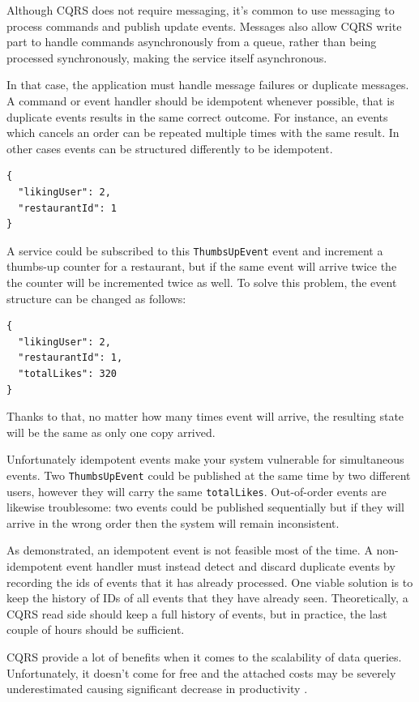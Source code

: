 \documentclass[conference]{IEEEtran}
\begin{document}
Although CQRS does not require messaging, it's common to use messaging to process commands and publish update events. Messages also allow CQRS write part to handle commands asynchronously from a queue, rather than being processed synchronously, making the service itself asynchronous.

In that case, the application must handle message failures or duplicate messages. A command or event handler should be idempotent whenever possible, that is duplicate events results in the same correct outcome. For instance, an events which cancels an order can be repeated multiple times with the same result. In other cases events can be structured differently to be idempotent.

\begin{lstlisting}
{
  "likingUser": 2,
  "restaurantId": 1
}
\end{lstlisting}

A service could be subscribed to this \texttt{ThumbsUpEvent} event and increment a thumbs-up counter for a restaurant, but if the same event will arrive twice the the counter will be incremented twice as well. To solve this problem, the event structure can be changed as follows:

\begin{lstlisting}
{
  "likingUser": 2,
  "restaurantId": 1,
  "totalLikes": 320
}
\end{lstlisting}

Thanks to that, no matter how many times event will arrive, the resulting state will be the same as only one copy arrived.

Unfortunately idempotent events make your system vulnerable for simultaneous events. Two \texttt{ThumbsUpEvent} could be published at the same time by two different users, however they will carry the same \texttt{totalLikes}. Out-of-order events are likewise troublesome: two events could be published sequentially but if they will arrive in the wrong order then the system will remain inconsistent.

As demonstrated, an idempotent event is not feasible most of the time. A non-idempotent event handler must instead detect and discard duplicate events by recording the ids of events that it has already processed. One viable solution is to keep the history of IDs of all events that they have already seen. Theoretically, a CQRS read side should keep a full history of events, but in practice, the last couple of hours should be sufficient.

CQRS provide a lot of benefits when it comes to the scalability of data queries. Unfortunately, it doesn’t come for free and the attached costs may be severely underestimated causing significant decrease in productivity .
\end{document}
